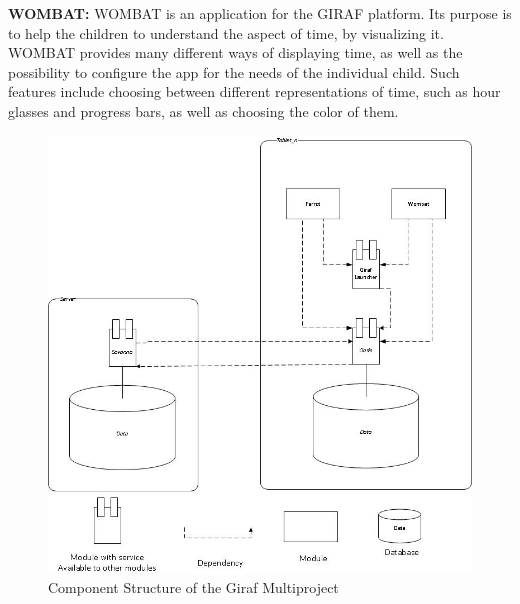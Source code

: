 \textbf{WOMBAT:} WOMBAT is an application for the GIRAF platform. Its purpose is to help the children to understand the aspect of time, by visualizing it. WOMBAT provides many different ways of displaying time, as well as the possibility to configure the app for the needs of the individual child. Such features include choosing between different representations of time, such as hour glasses and progress bars, as well as choosing the color of them.\newline

\begin{figure}
	\centering
		\includegraphics[scale=0.8]{images/Giraf_comp_pic.jpg}
	\caption{Component Structure of the Giraf Multiproject}
	\label{fig:Giraf_comp_pic}
\end{figure}
